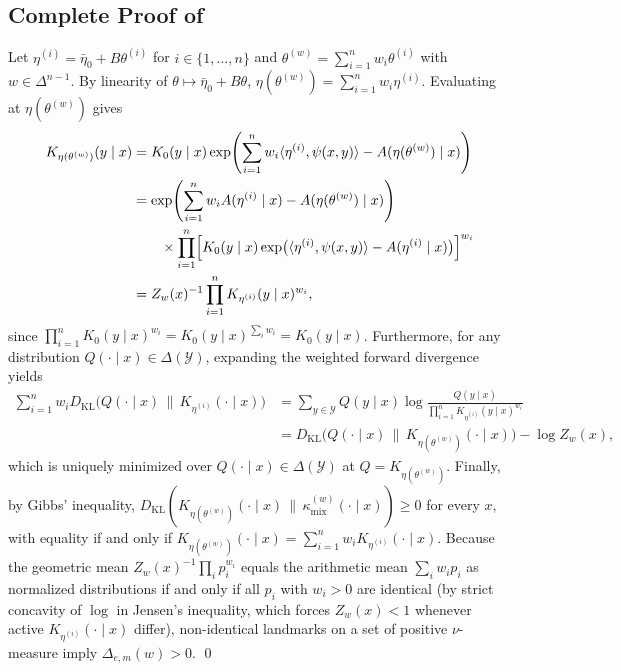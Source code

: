 \documentclass[11pt]{article}
\theoremstyle{definition}
\theoremstyle{plain}
\newcommand{\Ycal}{\mathcal{Y}}
\newcommand{\KL}{D_{\mathrm{KL}}}
\begin{document}
\subsection{Complete Proof of \texorpdfstring{}{Theorem 1}}
Let $\eta^{(i)} = \bar{\eta}_0 + B\theta^{(i)}$ for $i \in \{1,\dots,n\}$ and $\theta^{(w)} = \sum_{i=1}^n w_i \theta^{(i)}$ with $w \in \Delta^{n-1}$. By linearity of $\theta \mapsto \bar{\eta}_0 + B\theta$, $\eta(\theta^{(w)}) = \sum_{i=1}^n w_i \eta^{(i)}$. Evaluating  at $\eta(\theta^{(w)})$ gives
\begin{align*}
  K_{\eta(\theta^{(w)})}(y \mid x)
  &= K_0(y \mid x) \exp\!\left(\sum_{i=1}^n w_i \langle \eta^{(i)}, \psi(x,y) \rangle - A(\eta(\theta^{(w)}) \mid x)\right) \\
  &= \exp\!\left(\sum_{i=1}^n w_i A(\eta^{(i)} \mid x) - A(\eta(\theta^{(w)}) \mid x)\right) \\
  &\qquad \times \prod_{i=1}^n \Bigl[K_0(y \mid x)\exp\bigl(\langle \eta^{(i)}, \psi(x,y) \rangle - A(\eta^{(i)} \mid x)\bigr)\Bigr]^{w_i} \\
  &= Z_w(x)^{-1} \prod_{i=1}^n K_{\eta^{(i)}}(y \mid x)^{w_i},
\end{align*}
since $\prod_{i=1}^n K_0(y \mid x)^{w_i} = K_0(y \mid x)^{\sum_i w_i} = K_0(y \mid x)$. Furthermore, for any distribution $Q(\cdot \mid x) \in \Delta(\Ycal)$, expanding the weighted forward divergence yields
\begin{align*}
  \sum_{i=1}^n w_i \KL\!\bigl(Q(\cdot \mid x) \,\big\|\, K_{\eta^{(i)}}(\cdot \mid x)\bigr)
  &= \sum_{y \in \Ycal} Q(y \mid x) \log \frac{Q(y \mid x)}{\prod_{i=1}^n K_{\eta^{(i)}}(y \mid x)^{w_i}} \\
  &= \KL\!\bigl(Q(\cdot \mid x) \,\big\|\, K_{\eta(\theta^{(w)})}(\cdot \mid x)\bigr) - \log Z_w(x),
\end{align*}
which is uniquely minimized over $Q(\cdot \mid x) \in \Delta(\Ycal)$ at $Q = K_{\eta(\theta^{(w)})}$. Finally, by Gibbs' inequality, $\KL(K_{\eta(\theta^{(w)})}(\cdot \mid x) \,\|\, \kappa_{\mathrm{mix}}^{(w)}(\cdot \mid x)) \ge 0$ for every $x$, with equality if and only if $K_{\eta(\theta^{(w)})}(\cdot \mid x) = \sum_{i=1}^n w_i K_{\eta^{(i)}}(\cdot \mid x)$. Because the geometric mean $Z_w(x)^{-1}\prod_i p_i^{w_i}$ equals the arithmetic mean $\sum_i w_i p_i$ as normalized distributions if and only if all $p_i$ with $w_i > 0$ are identical (by strict concavity of $\log$ in Jensen's inequality, which forces $Z_w(x) < 1$ whenever active $K_{\eta^{(i)}}(\cdot \mid x)$ differ), non-identical landmarks on a set of positive $\nu$-measure imply $\Delta_{e,m}(w) > 0$. \qed
\end{document}
